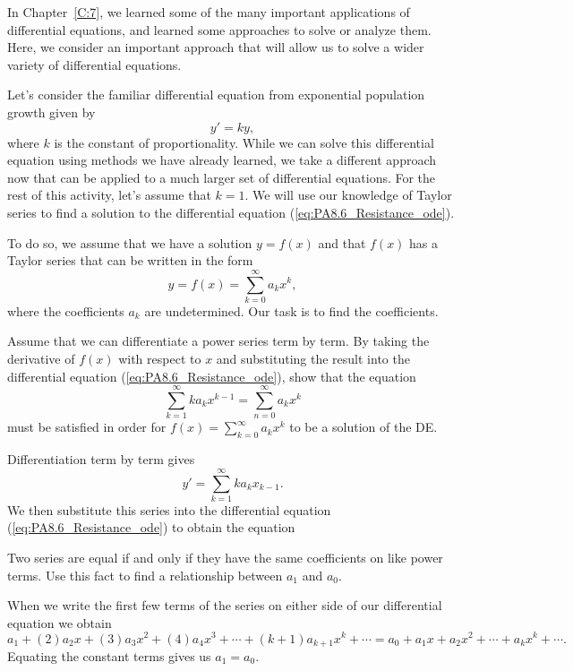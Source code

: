 \begin{pa} \label{PA:8.6}
In Chapter~\ref{C:7}, we learned some of the many important applications of differential equations, and learned some approaches to solve or analyze them.  Here, we consider an important approach that will allow us to solve a wider variety of differential equations.

Let's consider the familiar differential equation from exponential population growth given by
\begin{equation} \label{eq:PA8.6_Resistance_ode}
y' = ky,
\end{equation}
where $k$ is the constant of proportionality. While we can solve this differential equation using methods we have already learned, we take a different approach now that can be applied to a much larger set of differential equations. For the rest of this activity, let's assume that $k=1$. We will use our knowledge of Taylor series to find a solution to the differential equation (\ref{eq:PA8.6_Resistance_ode}). 

To do so, we assume that we have a solution $y=f(x)$ and that $f(x)$ has a Taylor series that can be written in the form
\[y = f(x) = \sum_{k=0}^{\infty} a_kx^k,\]
where the coefficients $a_k$ are undetermined. Our task is to find the coefficients.
\ba
    \item Assume that we can differentiate a power series term by term.  By taking the derivative of $f(x)$ with respect to $x$ and substituting the result into the differential equation (\ref{eq:PA8.6_Resistance_ode}), show that the equation
\[\sum_{k=1}^{\infty} ka_kx^{k-1} = \sum_{n=0}^{\infty} a_kx^{k}\]
must be satisfied in order for $f(x) = \sum_{k=0}^{\infty} a_kx^k$ to be a solution of the DE.
\begin{activitySolution}

Differentiation term by term gives
\[y' = \sum_{k=1}^{\infty} ka_kx_{k-1}.\]
We then substitute this series into the differential equation (\ref{eq:PA8.6_Resistance_ode}) to obtain the equation

\end{activitySolution}

\item Two series are equal if and only if they have the same coefficients on like power terms. Use this fact to find a relationship between $a_1$ and $a_0$.

\begin{activitySolution}

When we write the first few terms of the series on either side of our differential equation we obtain
\[a_1 + (2)a_2x + (3)a_3x^2 + (4)a_4x^3 + \cdots + (k+1)a_{k+1}x^{k} + \cdots = a_0 + a_1x + a_2x^2 + \cdots + a_kx^k + \cdots.\]
Equating the constant terms gives us $a_1 = a_0$.


\end{activitySolution}
\end{pa}
